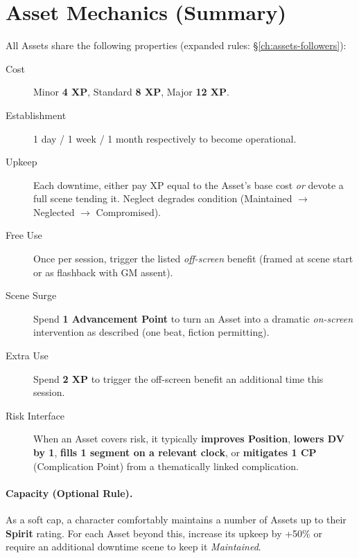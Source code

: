 \section{Asset Mechanics (Summary)}
All Assets share the following properties (expanded rules: \S\ref{ch:assets-followers}):
\begin{description}
  \item[Cost] Minor \textbf{4 XP}, Standard \textbf{8 XP}, Major \textbf{12 XP}. 
  \item[Establishment] 1 day / 1 week / 1 month respectively to become operational.
  \item[Upkeep] Each downtime, either pay XP equal to the Asset’s base cost \emph{or} devote a full scene tending it. Neglect degrades condition (Maintained $\rightarrow$ Neglected $\rightarrow$ Compromised). 
  \item[Free Use] Once per session, trigger the listed \emph{off-screen} benefit (framed at scene start or as flashback with GM assent).
  \item[Scene Surge] Spend \textbf{1 Advancement Point} to turn an Asset into a dramatic \emph{on-screen} intervention as described (one beat, fiction permitting). 
  \item[Extra Use] Spend \textbf{2 XP} to trigger the off-screen benefit an additional time this session.
  \item[Risk Interface] When an Asset covers risk, it typically \textbf{improves Position}, \textbf{lowers DV by 1}, \textbf{fills 1 segment on a relevant clock}, or \textbf{mitigates 1 CP} (Complication Point) from a thematically linked complication. 
\end{description}

\paragraph{Capacity (Optional Rule).}
As a soft cap, a character comfortably maintains a number of Assets up to their \textbf{Spirit} rating. For each Asset beyond this, increase its upkeep by +50\% or require an additional downtime scene to keep it \emph{Maintained}.

